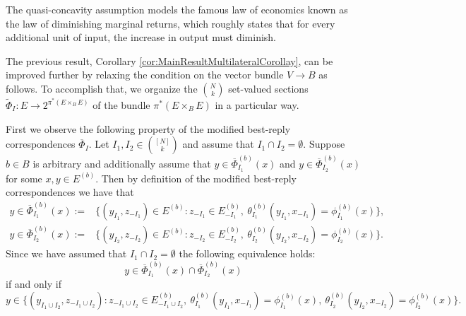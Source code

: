 \documentclass[a4paper,11pt,reqno,english]{amsart}
\theoremstyle{plain}
\theoremstyle{definition}
\begin{document}
\medskip
The quasi-concavity assumption models the famous law of economics known as the law of diminishing marginal returns, which roughly states that for every additional unit of input, the increase in output must diminish.

\medskip
The previous result, Corollary \ref{cor:MainResultMultilateralCorollay}, can be improved further by relaxing the condition on the vector bundle $V\longrightarrow B$ as follows.
To accomplish that, we organize the $\binom{N}{k}$ set-valued sections $\widetilde{\Phi}_I\colon E\longrightarrow 2^{\pi^*(E\times_B E)}$ of the bundle $\pi^*(E\times_B E)$ in a particular way.

\medskip
First we observe the following  property of the modified best-reply correspondences $\overline{\Phi}_I$.
Let $I_1, I_2 \in\binom{[N]}{k}$ and assume that $I_1\cap I_2=\emptyset$.
Suppose $b\in B$ is arbitrary and additionally assume that $y\in \overline{\Phi}^{(b)}_{I_1}(x)$ and $y\in \overline{\Phi}^{(b)}_{I_2}(x)$ for some $x,y\in E^{(b)}$.
Then by definition of the modified best-reply correspondences we have that
\begin{align*}
	y\in \overline{\Phi}_{I_1}^{(b)}(x):= & \{(y_{I_1}, z_{-I_1})\in E^{(b)} : z_{-I_1}\in E^{(b)}_{-I_1}, \ \theta_{I_1}^{(b)}(y_{I_1}, x_{-I_1}) = \phi_{I_1}^{(b)}(x)\}, \\
	y\in \overline{\Phi}_{I_2}^{(b)}(x):= & \{(y_{I_2}, z_{-I_2})\in E^{(b)} : z_{-I_2}\in E^{(b)}_{-I_2}, \ \theta_{I_2}^{(b)}(y_{I_2}, x_{-I_2}) = \phi_{I_2}^{(b)}(x)\}.
\end{align*}
Since we have assumed that $I_1\cap I_2=\emptyset$ the following equivalence holds:
\[
	y\in \overline{\Phi}_{I_1}^{(b)}(x) \cap \overline{\Phi}_{I_2}^{(b)}(x)
\]
if and only if
\begin{displaymath}
	y\in \{(y_{I_1\cup I_2}, z_{-I_1\cup I_2}) : z_{-I_1\cup I_2} \in E^{(b)}_{-I_1\cup I_2}, \  \theta_{I_1}^{(b)}(y_{I_1}, x_{-I_1}) = \phi_{I_1}^{(b)}(x), \ \theta_{I_2}^{(b)}(y_{I_2}, x_{-I_2}) = \phi_{I_2}^{(b)}(x)\}.
\end{displaymath}
\end{document}
